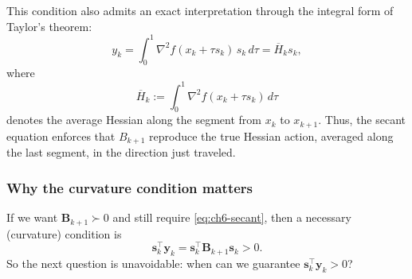 This condition also admits an exact interpretation through the integral form of
Taylor's theorem:
\begin{equation}
  \label{eq:ch6-average-hessian}
  y_k
  =
  \int_0^1 \nabla^2 f(x_k+\tau s_k)\, s_k\, d\tau
  =
  \overline H_k s_k,
\end{equation}
where
\begin{equation}
  \overline H_k := \int_0^1 \nabla^2 f(x_k+\tau s_k)\, d\tau
\end{equation}
denotes the average Hessian along the segment from $x_k$ to $x_{k+1}$. Thus,
the secant equation enforces that $B_{k+1}$ reproduce the true Hessian action,
averaged along the last segment, in the direction just traveled.

\subsubsection{Why the curvature condition matters}
If we want $\mathbf{B}_{k+1}\succ 0$ and still require
\eqref{eq:ch6-secant}, then a necessary (curvature) condition is
\[
  \mathbf{s}_k^\top \mathbf{y}_k
  =\mathbf{s}_k^\top \mathbf{B}_{k+1}\mathbf{s}_k>0.
\]
So the next question is unavoidable: when can we guarantee
$\mathbf{s}_k^\top \mathbf{y}_k>0$?

